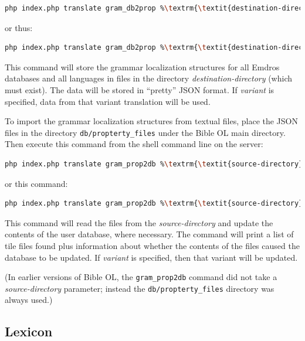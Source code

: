 \documentclass[11pt,oneside,a4paper]{memoir}
\begin{document}
\begin{lstlisting}[language=bash,basicstyle={\ttfamily}]
php index.php translate gram_db2prop %\textrm{\textit{destination-directory}}%
\end{lstlisting}

\noindent
or thus:

\begin{lstlisting}[language=bash,basicstyle={\ttfamily}]
php index.php translate gram_db2prop %\textrm{\textit{destination-directory}}% %\textrm{\textit{variant}}%
\end{lstlisting}

This command will store the grammar localization structures for all Emdros databases and all
languages in files in the directory \emph{destination-directory} (which must exist). The data will
be stored in ``pretty'' JSON format. If \emph{variant} is specified, data from that variant
translation will be used.

To import the grammar localization structures from textual files, place the JSON files in the directory
\texttt{db/propterty\_files} under the Bible OL main directory. Then execute this command from the
shell command line on the server:

\begin{lstlisting}[language=bash,basicstyle={\ttfamily}]
php index.php translate gram_prop2db %\textrm{\textit{source-directory}}%
\end{lstlisting}

\noindent
or this command:

\begin{lstlisting}[language=bash,basicstyle={\ttfamily}]
php index.php translate gram_prop2db %\textrm{\textit{source-directory}}% %\textrm{\textit{variant}}%
\end{lstlisting}

This command will read the files from the \emph{source-directory} and update the contents of the
user database, where necessary. The command will print a list of tile files found plus information
about whether the contents of the files caused the database to be updated. If \emph{variant} is
specified, then that variant will be updated.

(In earlier versions of Bible OL, the \texttt{gram\_prop2db} command did not take a
\emph{source-directory} parameter; instead the \texttt{db/propterty\_files} directory was always used.)

\subsection{Lexicon}
\end{document}
